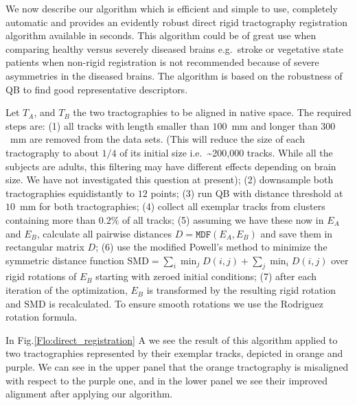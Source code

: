 \documentclass[journal]{IEEEtran}
\begin{document}
We now describe our algorithm which is efficient and simple
to use, completely automatic and provides an evidently robust direct
rigid tractography registration algorithm available in seconds. This
algorithm could be of great use when comparing healthy versus severely
diseased brains e.g.~stroke or vegetative state patients when non-rigid
registration is not recommended because of severe asymmetries in the
diseased brains. The algorithm is based on the robustness of QB to find
good representative descriptors.

Let  $T_{A}$, and $T_{B}$ the two tractographies to be aligned
in native
space. The required steps are: (1) all tracks with length smaller than $100$~mm and longer than $300$~mm
are removed from the data sets. (This will reduce the size of each tractography
to about $1/4$ of its initial size i.e.~\textasciitilde200,000 tracks. While all
the subjects are adults, this filtering may have different effects
depending on brain size. We have not investigated this question at
present);
(2) downsample both tractographies equidistantly to $12$ points; 
(3) run QB with distance threshold at $10$~mm for both tractographies;
(4) collect all exemplar tracks from clusters containing more than $0.2\%$
of all tracks; (5) assuming we have these now in $E_{A}$ and $E_{B}$,
calculate all pairwise distances $D=\mathtt{MDF}(E_{A},E_{B})$ and
save them in rectangular matrix $D$;
(6) use the modified Powell's method \cite{fletcher1987practical} to minimize
the symmetric distance function $\mathrm{SMD}=\sum_{i}\min_{j}D(i,j)+\sum_{j}\min_{i}D(i,j)$ over rigid rotations of $E_{B}$ starting
with zeroed initial conditions; 
(7) after each iteration of the optimization,
$E_{B}$ is transformed by the resulting rigid rotation and $\mathrm{SMD}$
is recalculated. To ensure smooth rotations we use the Rodriguez
rotation formula.

In Fig.\ref{Flo:direct_registration} A we see the result of this
algorithm applied to two tractographies represented by their
exemplar tracks, depicted in orange and purple. We can see in the
upper panel that the orange tractography is misaligned with respect to
the purple one, and in the lower panel we see their improved alignment
after applying our algorithm.
\end{document}
